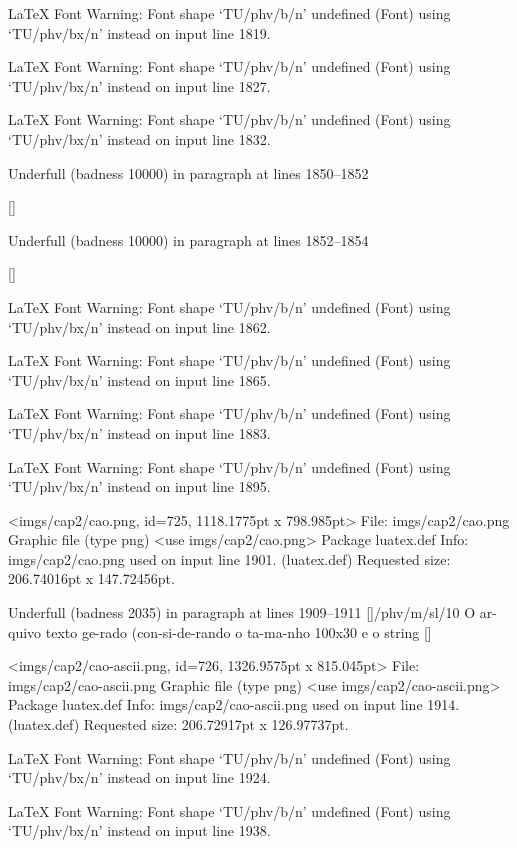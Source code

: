LaTeX Font Warning: Font shape `TU/phv/b/n' undefined
(Font)              using `TU/phv/bx/n' instead on input line 1819.


LaTeX Font Warning: Font shape `TU/phv/b/n' undefined
(Font)              using `TU/phv/bx/n' instead on input line 1827.


LaTeX Font Warning: Font shape `TU/phv/b/n' undefined
(Font)              using `TU/phv/bx/n' instead on input line 1832.


Underfull \hbox (badness 10000) in paragraph at lines 1850--1852

 []


Underfull \hbox (badness 10000) in paragraph at lines 1852--1854

 []


LaTeX Font Warning: Font shape `TU/phv/b/n' undefined
(Font)              using `TU/phv/bx/n' instead on input line 1862.


LaTeX Font Warning: Font shape `TU/phv/b/n' undefined
(Font)              using `TU/phv/bx/n' instead on input line 1865.


LaTeX Font Warning: Font shape `TU/phv/b/n' undefined
(Font)              using `TU/phv/bx/n' instead on input line 1883.


LaTeX Font Warning: Font shape `TU/phv/b/n' undefined
(Font)              using `TU/phv/bx/n' instead on input line 1895.

<imgs/cap2/cao.png, id=725, 1118.1775pt x 798.985pt>
File: imgs/cap2/cao.png Graphic file (type png)
<use imgs/cap2/cao.png>
Package luatex.def Info: imgs/cap2/cao.png  used on input line 1901.
(luatex.def)             Requested size: 206.74016pt x 147.72456pt.

Underfull \hbox (badness 2035) in paragraph at lines 1909--1911
[]\TU/phv/m/sl/10 O ar-quivo texto ge-rado (con-si-de-rando o ta-ma-nho 100x30 e o string
 []

<imgs/cap2/cao-ascii.png, id=726, 1326.9575pt x 815.045pt>
File: imgs/cap2/cao-ascii.png Graphic file (type png)
<use imgs/cap2/cao-ascii.png>
Package luatex.def Info: imgs/cap2/cao-ascii.png  used on input line 1914.
(luatex.def)             Requested size: 206.72917pt x 126.97737pt.

LaTeX Font Warning: Font shape `TU/phv/b/n' undefined
(Font)              using `TU/phv/bx/n' instead on input line 1924.


LaTeX Font Warning: Font shape `TU/phv/b/n' undefined
(Font)              using `TU/phv/bx/n' instead on input line 1938.


